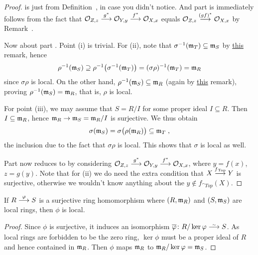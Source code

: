 \documentclass[a4paper,parskip=half,numbers=enddot, DIV=12]{scrreprt}
\begin{document}
\begin{proof}
	 is just \itememph{\alpha} from Definition~, in case you didn't notice. And part  is immediately follows from the fact that $\Oo_{Z,z}\morphism[g^*]\Oo_{Y,y}\morphism[f^*]\Oo_{X,x}$ equals $\Oo_{Z,z}\morphism[(gf)^*]\Oo_{X,x}$ by Remark~.
	
	Now about part . Point (i) is trivial. For (ii), note that $\sigma^{-1}(\mathfrak{m}_T)\subseteq\mathfrak{m}_S$ by \hyperref[rem:localMorphismStuff]{this} remark, hence
	\begin{align*}
		\rho^{-1}(\mathfrak{m}_S) \supseteq \rho^{-1}\big(\sigma^{-1}(\mathfrak{m}_T)\big) = (\sigma\rho)^{-1} (\mathfrak{m}_T) = \mathfrak{m}_R
	\end{align*}
	since $\sigma\rho$ is local. On the other hand, $\rho^{-1}(\mathfrak{m}_S)\subseteq \mathfrak{m}_R$ (again by \hyperref[rem:localMorphismStuff]{this} remark), proving $\rho^{-1}(\mathfrak{m}_S)=\mathfrak{m}_R$, that is, $\rho$ is local.
	
	For point (iii), we may assume that $S=R/I$ for some proper ideal $I\subseteq R$. Then $I\subseteq\mathfrak{m}_R$, hence $\mm_R\morphism \mm_S=\mm_R/I$ is surjective. We thus obtain
	\begin{align*}
		\sigma(\mathfrak{m}_S)=\sigma\big(\rho(\mathfrak{m}_R)\big)\subseteq\mathfrak{m}_T\;,
	\end{align*}
	the inclusion due to the fact that $\sigma\rho$ is local. This shows that $\sigma$ is local as well.
	
	Part  now reduces to  by considering $\Oo_{Z,z}\morphism[g^*]\Oo_{Y,y}\morphism[f^*]\Oo_{X,x}$, where $y=f(x)$, $z=g(y)$. Note that for (ii) we do need the extra condition that $X\morphism[\smash{f}_{\cat{Top}}]Y$ is surjective, otherwise we wouldn't know anything about the $y\not\in f_{\cat{Top}}(X)$.
\end{proof}
\begin{fact}
    If $R\morphism[\phi]S$ is a surjective ring homomorphism where $(R,\mathfrak{m}_R)$ and $(S,\mathfrak{m}_S)$ are local rings, then $\phi$ is local.
\end{fact}
\begin{proof}
	Since $\phi$ is surjective, it induces an isomorphism $\ov{\phi}\colon R/\ker\phi\isomorphism S$. As local rings are forbidden to be the zero ring, $\ker\phi$ must be a proper ideal of $R$ and hence contained in $\mathfrak{m}_R$. Then $\phi$ maps $\mathfrak{m}_R$ to $\mathfrak{m}_R/\ker\varphi=\mathfrak{m}_S$.
\end{proof}
\end{document}

